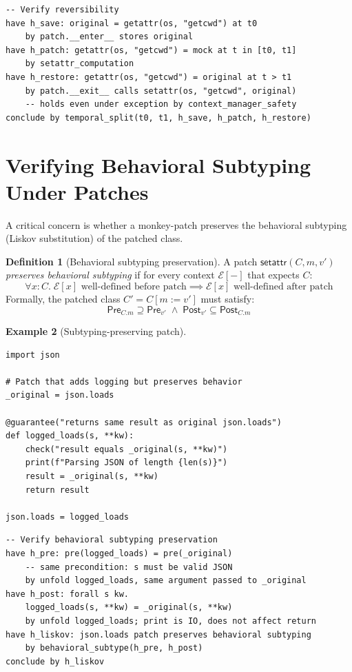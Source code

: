 \documentclass[11pt,a4paper]{report}
\theoremstyle{definition}
\newtheorem{definition}{Definition}[chapter]
\newtheorem{example}[definition]{Example}
\theoremstyle{plain}
\newcommand{\Pre}{\mathsf{Pre}}
\newcommand{\Post}{\mathsf{Post}}
\begin{document}
\begin{lstlisting}[style=proof]
-- Verify reversibility
have h_save: original = getattr(os, "getcwd") at t0
    by patch.__enter__ stores original
have h_patch: getattr(os, "getcwd") = mock at t in [t0, t1]
    by setattr_computation
have h_restore: getattr(os, "getcwd") = original at t > t1
    by patch.__exit__ calls setattr(os, "getcwd", original)
    -- holds even under exception by context_manager_safety
conclude by temporal_split(t0, t1, h_save, h_patch, h_restore)
\end{lstlisting}


\section{Verifying Behavioral Subtyping Under Patches}
\label{sec:patch-subtype}

A critical concern is whether a monkey-patch preserves the behavioral subtyping
(Liskov substitution) of the patched class.

\begin{definition}[Behavioral subtyping preservation]
A patch $\mathsf{setattr}(C, m, v')$ \emph{preserves behavioral subtyping} if
for every context $\mathcal{E}[-]$ that expects $C$:
\[
  \forall x : C.\; \mathcal{E}[x] \text{ well-defined before patch}
  \implies
  \mathcal{E}[x] \text{ well-defined after patch}
\]
Formally, the patched class $C' = C[m := v']$ must satisfy:
\[
  \Pre_{C.m} \supseteq \Pre_{v'} \;\wedge\;
  \Post_{v'} \subseteq \Post_{C.m}
\]
\end{definition}

\begin{example}[Subtyping-preserving patch]
\begin{lstlisting}[style=synhopy]
import json

# Patch that adds logging but preserves behavior
_original = json.loads

@guarantee("returns same result as original json.loads")
def logged_loads(s, **kw):
    check("result equals _original(s, **kw)")
    print(f"Parsing JSON of length {len(s)}")
    result = _original(s, **kw)
    return result

json.loads = logged_loads
\end{lstlisting}

\begin{lstlisting}[style=proof]
-- Verify behavioral subtyping preservation
have h_pre: pre(logged_loads) = pre(_original)
    -- same precondition: s must be valid JSON
    by unfold logged_loads, same argument passed to _original
have h_post: forall s kw.
    logged_loads(s, **kw) = _original(s, **kw)
    by unfold logged_loads; print is IO, does not affect return
have h_liskov: json.loads patch preserves behavioral subtyping
    by behavioral_subtype(h_pre, h_post)
conclude by h_liskov
\end{lstlisting}
\end{example}
\end{document}
